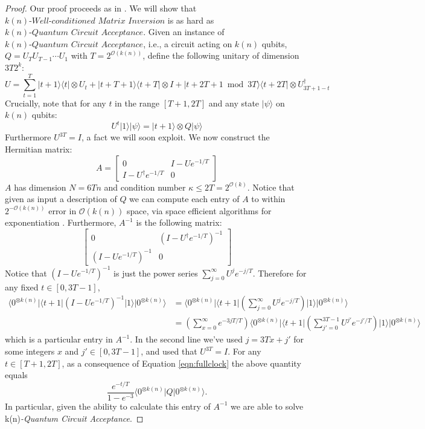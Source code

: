 \documentclass[11pt]{article}
\theoremstyle{definition}
\theoremstyle{remark}
\theoremstyle{definition}
\newcommand\matrixinvert[1]{{\ensuremath{#1}}\textit{-Well-conditioned Matrix Inversion}}
\newcommand\qca[1]{#1\textit{-Quantum Circuit Acceptance}}
\newcommand{\zero}{\ensuremath{0^{\otimes{k(n)}}}}
\newcommand\bigoh{\mathcal{O}}
\begin{document}
\begin{proof}
Our proof proceeds as in \cite{HHL}.  We will show that $\matrixinvert{k(n)}$ is as hard as $\qca{k(n)}$.  Given an instance of $\qca{k(n)}$, i.e., a circuit acting on $k(n)$ qubits, $Q=U_TU_{T-1}\cdots U_1$ with $T = 2^{\mathcal{O}(k(n))}$, define the following unitary of dimension $3T2^k$:
\[U=\sum_{t=1}^{T}|t+1\rangle\langle t|\otimes U_t+|t+T+1\rangle\langle t+T|\otimes I+|t+2T+1\bmod{3T}\rangle\langle t+2T|\otimes U_{3T+1-t}^{\dagger}\]	
Crucially, note that for any $t$ in the range $[T+1,2T]$ and any state $|\psi\rangle$ on $k(n)$ qubits: 
\begin{equation}\label{eqn:fullclock}
	U^t|1\rangle|\psi\rangle=|t+1\rangle\otimes Q|\psi\rangle
\end{equation}
Furthermore $U^{3T}=I$, a fact we will soon exploit. We now construct the Hermitian matrix:
\begin{equation}
A=\begin{bmatrix}
    0 & I-Ue^{-1/T}\\
   I-U^{\dagger}e^{-1/T} &  0
\end{bmatrix}
\end{equation}
 $A$ has dimension $N=6Tn$ and condition number $\kappa\leq 2T=2^{\bigoh (k)}$.  Notice that given as input a description of $Q$ we can compute each entry of $A$ to within $2^{-\mathcal{O}(k(n))}$ error in $\mathcal{O}(k(n))$ space, via space efficient algorithms for exponentiation \cite{reif}.
   Furthermore, $A^{-1}$ is the following matrix:
\begin{equation}
\begin{bmatrix}
    0 & \left(I-U^\dagger e^{-1/T}\right)^{-1}\\
   \left(I-Ue^{-1/T}\right)^{-1} &  0
\end{bmatrix}
\end{equation}
 Notice that $\left(I-Ue^{-1/T}\right)^{-1}$ is just the power series $\sum_{j=0}^\infty U^j e^{-j/T}$. Therefore for any fixed $t \in [0,3T-1]$,
 \begin{align}
\langle\zero|\langle t+1|\left(I-Ue^{-1/T}\right)^{-1}|1\rangle|\zero\rangle
&=\langle\zero|\langle t+1|\left(\sum_{j=0}^\infty U^j e^{-j/T}\right)|1\rangle|\zero\rangle \\
&= \left( \sum_{x=0}^\infty e^{-3jT/T} \right) \langle\zero|\langle t+1|\left(\sum_{j'=0}^{3T-1} U^{j'} e^{-j'/T}\right)|1\rangle|\zero\rangle
\end{align}
which is a particular entry in $A^{-1}$. In the second line we've used $j = 3Tx + j'$ for some integers $x$ and $j' \in [0,3T-1]$, and used that $U^{3T}=I$.  For any $t \in [T+1,2T]$, as a consequence of Equation \ref{eqn:fullclock} the above quantity equals
\begin{equation}
\frac{e^{-t/T}}{1-e^{-3}}\langle\zero|Q|\zero\rangle.
\end{equation}
In particular, given the ability to calculate this entry of $A^{-1}$ we are able to solve \qca{k(n)}.
\end{proof}
\end{document}
